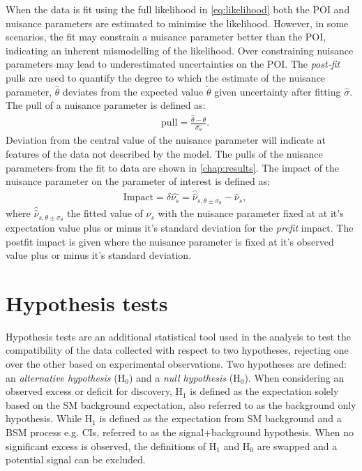 When the data is fit using the full likelihood in \cref{eq:likelihood} both the POI and nuisance parameters are estimated to minimise the likelihood. However, in some scenarios, the fit may constrain a nuisance parameter better than the POI, indicating an inherent mismodelling of the likelihood. Over constraining nuisance parameters may lead to underestimated uncertainties on the POI. The \emph{post-fit} pulls are used to quantify the degree to which the estimate of the nuisance parameter, $\hat{\theta}$ deviates from the expected value $\tilde{\theta}$ given uncertainty after fitting $\hat{\sigma}$. The pull of a nuisance parameter is defined as: 
\begin{equation}
    \label{eq:nppull}
    \begin{aligned}
        & \mathrm{pull} = \frac{\hat{\theta} -{\theta}}{\hat{\sigma_\theta}}.
    \end{aligned}
\end{equation}
Deviation from the central value of the nuisance parameter will indicate at features of the data not described by the model. The pulls of the nuisance parameters from the fit to data are shown in \cref{chap:results}. The impact of the nuisance parameter on the parameter of interest is defined as:
\begin{equation}
    \label{eq:npinpact}
    \begin{aligned}
        & \mathrm{Impact} = \delta \hat{\nu_s} = \hat{\hat{\nu}}_{s,\theta \pm \sigma_\theta} - \hat{\nu}_s,
    \end{aligned}
\end{equation}
where $\hat{\hat{\nu}}_{s,\theta \pm \sigma_\theta}$ the fitted value of $\nu_s$ with the nuisance parameter fixed at at it's expectation value plus or minus it's standard deviation for the \emph{prefit} impact. The postfit impact is given where the nuisance parameter is fixed at it's observed value plus or minus it's standard deviation. 


\section{Hypothesis tests}
Hypothesis tests are an additional statistical tool used in the analysis to test the compatibility of the data collected with respect to two hypotheses, rejecting one over the other based on experimental observations. Two hypotheses are defined: an \emph{alternative hypothesis} ($\mathrm{H_0}$) and a \emph{null hypothesis} ($\mathrm{H_0}$). When considering an observed excess or deficit for discovery, $\mathrm{H_1}$ is defined as the expectation solely based on the SM background expectation, also referred to as the background only hypothesis. While $\mathrm{H_1}$ is defined as the expectation from SM background and a BSM process e.g. CIs, referred to as the signal+background hypothesis. When no significant excess is observed, the definitions of $\mathrm{H_1}$ and $\mathrm{H_0}$ are swapped and a potential signal can be excluded. 

